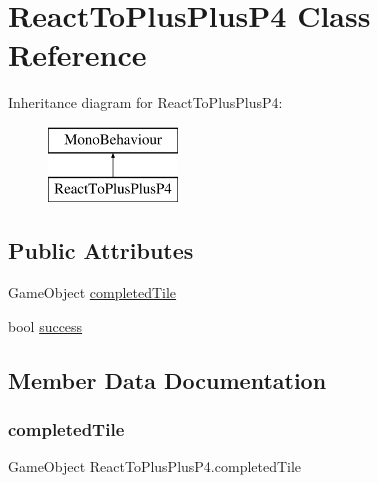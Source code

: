 \hypertarget{class_react_to_plus_plus_p4}{}\section{React\+To\+Plus\+Plus\+P4 Class Reference}
\label{class_react_to_plus_plus_p4}
Inheritance diagram for React\+To\+Plus\+Plus\+P4\+:\begin{figure}[H]
\begin{center}
\leavevmode
\includegraphics[height=2.000000cm]{class_react_to_plus_plus_p4}
\end{center}
\end{figure}
\subsection*{Public Attributes}
\begin{DoxyCompactItemize}
\item 
Game\+Object \hyperlink{class_react_to_plus_plus_p4_a484ac4294b1e856d3add58bb807c0da8}{completed\+Tile}
\item 
bool \hyperlink{class_react_to_plus_plus_p4_ac36d80e13ac09e645f05c56f6a0a6a2d}{success}
\end{DoxyCompactItemize}


\subsection{Member Data Documentation}
\mbox{\label{class_react_to_plus_plus_p4_a484ac4294b1e856d3add58bb807c0da8}} 
\subsubsection{\texorpdfstring{completed\+Tile}{completedTile}}
{\footnotesize\ttfamily Game\+Object React\+To\+Plus\+Plus\+P4.\+completed\+Tile}

\mbox{\label{class_react_to_plus_plus_p4_ac36d80e13ac09e645f05c56f6a0a6a2d}} 

